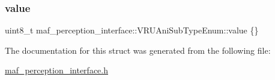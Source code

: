 \subsubsection{\texorpdfstring{value}{value}}
{\footnotesize\ttfamily uint8\+\_\+t maf\+\_\+perception\+\_\+interface\+::\+V\+R\+U\+Ani\+Sub\+Type\+Enum\+::value \{\}}



The documentation for this struct was generated from the following file\+:\begin{DoxyCompactItemize}
\item 
\hyperlink{maf__perception__interface_8h}{maf\+\_\+perception\+\_\+interface.\+h}\end{DoxyCompactItemize}
